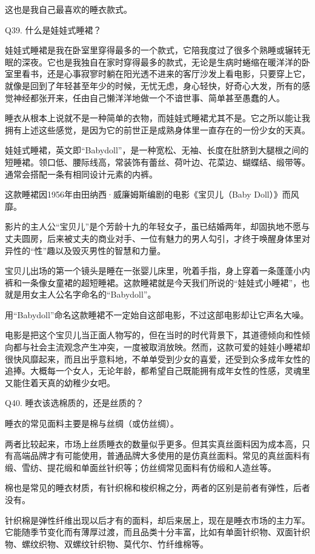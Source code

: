 \documentclass[12pt,UTF8]{ctexbook}
\begin{document}
这也是我自己最喜欢的睡衣款式。


Q39. 什么是娃娃式睡裙？


娃娃式睡裙是我在卧室里穿得最多的一个款式，它陪我度过了很多个熟睡或辗转无眠的深夜。它也是我独自在家时穿得最多的款式，无论是生病时蜷缩在暖洋洋的卧室里看书，还是心事寂寥时躺在阳光透不进来的客厅沙发上看电影，只要穿上它，就像是回到了年轻甚至年少的时候，无忧无虑，身心轻快，好奇心大发，所有的感觉神经都张开来，任由自己懒洋洋地做一个不谙世事、简单甚至愚蠢的人。

睡衣从根本上说就不是一种简单的衣物，而娃娃式睡裙尤其不是。它之所以能让我拥有上述这些感觉，是因为它的前世正是成熟身体里一直存在的一份少女的天真。


娃娃式睡裙，英文即“Babydoll”，是一种宽松、无袖、长度在肚脐到大腿根之间的短睡裙。领口低、腰际线高，常装饰有蕾丝、荷叶边、花菜边、蝴蝶结、缎带等。通常会搭配一条有相同设计元素的内裤。

这款睡裙因1956年由田纳西·威廉姆斯编剧的电影《宝贝儿（Baby Doll）》而风靡。

影片的主人公“宝贝儿”是个芳龄十九的年轻女子，虽已结婚两年，却固执地不愿与丈夫圆房，后来被丈夫的商业对手、一位有魅力的男人勾引，才终于唤醒身体里对异性的“性”趣以及毁灭男性的智慧和力量。

宝贝儿出场的第一个镜头是睡在一张婴儿床里，吮着手指，身上穿着一条蓬蓬小内裤和一条像女童裙的超短睡裙。这款睡裙就是今天我们所说的“娃娃式小睡裙”，也就是用女主人公名字命名的“Babydoll”。

用“Babydoll”命名这款睡裙不一定始自这部电影，不过这部电影却让它声名大噪。

电影是把这个宝贝儿当正面人物写的，但在当时的时代背景下，其道德倾向和性倾向都与社会主流观念产生冲突，一度被取消放映。然而，这款可爱的娃娃小睡裙却很快风靡起来，而且出乎意料地，不单单受到少女的喜爱，还受到众多成年女性的追捧。大概每一个女人，无论年龄，都希望自己既能拥有成年女性的性感，灵魂里又能住着天真的幼稚少女吧。


Q40. 睡衣该选棉质的，还是丝质的？


睡衣的常见面料主要是棉与丝绸（或仿丝绸）。

两者比较起来，市场上丝质睡衣的数量似乎更多。但其实真丝面料因为成本高，只有高端品牌才有可能使用，普通品牌大多使用的是仿真丝面料。常见的真丝面料有缎、雪纺、提花缎和单面丝针织等；仿丝绸常见面料有仿缎和人造丝等。

棉也是常见的睡衣材质，有针织棉和梭织棉之分，两者的区别是前者有弹性，后者没有。

针织棉是弹性纤维出现以后才有的面料，却后来居上，现在是睡衣市场的主力军。它能随季节变化而有薄厚过渡，而且品类十分丰富，比如有单面针织物、双面针织物、螺纹织物、双螺纹针织物、莫代尔、竹纤维棉等。
\end{document}
